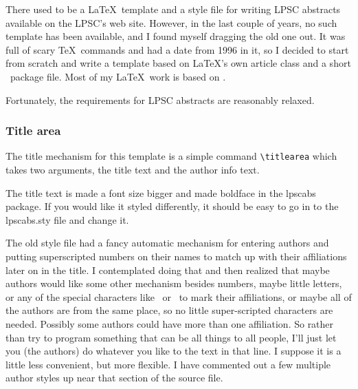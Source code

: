 \documentclass[twoside]{article}
\begin{document}


%



There used to be a \LaTeX\ template and a style file for writing
LPSC abstracts available on the LPSC's web site.  However, in the
last couple of years, no such template has been available, and I
found myself dragging the old one out.  It was full of scary \TeX\
commands and had a date from 1996 in it, so I decided to start from
scratch and write a template based on \LaTeX's own article class and 
a short \LaTeXe\ package file.  Most of my \LaTeX\ work is based on
\citet{latexguide}.

Fortunately, the requirements for LPSC abstracts \citep{LPSC} are
reasonably relaxed.

\subsubsection*{Title area}

The title mechanism for this template is a simple command
\verb=\titlearea= which takes two arguments, the title text and the
author info text.

The title text is made a font size bigger and made boldface in the
lpscabs package.  If you would like it styled differently, it should
be easy to go in to the lpscabs.sty file and change it.

The old style file had a fancy automatic mechanism for entering
authors and putting superscripted numbers on their names to match
up with their affiliations later on in the title.  I contemplated
doing that and then realized that maybe authors would like some
other mechanism besides numbers, maybe little letters, or any of
the special characters like \dag\ or \ddag\ to mark their affiliations,
or maybe all of the authors are from the same place, so no little
super-scripted characters are needed.  Possibly some authors could have
more than one affiliation.  So rather than try to program something
that can be all things to all people, I'll just let you (the authors)
do whatever you like to the text in that line.  I suppose it is a 
little less convenient, but more flexible.  I have commented out
a few multiple author styles up near that section of the source 
file.
\end{document}
